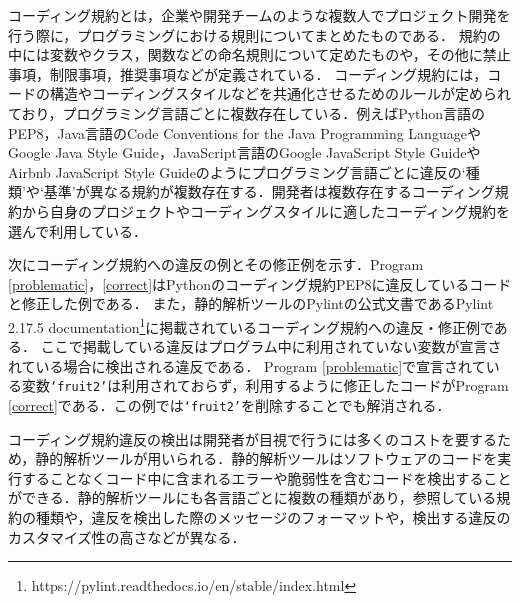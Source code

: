 \documentclass[11pt,dvipdfmx]{jreport}
\begin{document}
コーディング規約とは，企業や開発チームのような複数人でプロジェクト開発を行う際に，プログラミングにおける規則についてまとめたものである．
規約の中には変数やクラス，関数などの命名規則について定めたものや，その他に禁止事項，制限事項，推奨事項などが定義されている．
コーディング規約には，コードの構造やコーディングスタイルなどを共通化させるためのルールが定められており，プログラミング言語ごとに複数存在している．例えばPython言語のPEP8，Java言語のCode Conventions for the Java Programming LanguageやGoogle Java Style Guide，JavaScript言語のGoogle JavaScript Style GuideやAirbnb JavaScript Style Guideのようにプログラミング言語ごとに違反の`種類'や`基準'が異なる規約が複数存在する．開発者は複数存在するコーディング規約から自身のプロジェクトやコーディングスタイルに適したコーディング規約を選んで利用している．

次にコーディング規約への違反の例とその修正例を示す．Program \ref{problematic}，\ref{correct}はPythonのコーディング規約PEP8に違反しているコードと修正した例である．
また，静的解析ツールのPylintの公式文書であるPylint 2.17.5 documentation\footnote{https://pylint.readthedocs.io/en/stable/index.html}に掲載されているコーディング規約への違反・修正例である．
ここで掲載している違反はプログラム中に利用されていない変数が宣言されている場合に検出される違反である．
Program \ref{problematic}で宣言されている変数\texttt{`fruit2'}は利用されておらず，利用するように修正したコードがProgram \ref{correct}である．この例では\texttt{`fruit2'}を削除することでも解消される．

コーディング規約違反の検出は開発者が目視で行うには多くのコストを要するため，静的解析ツールが用いられる．静的解析ツールはソフトウェアのコードを実行することなくコード中に含まれるエラーや脆弱性を含むコードを検出することができる．静的解析ツールにも各言語ごとに複数の種類があり，参照している規約の種類や，違反を検出した際のメッセージのフォーマットや，検出する違反のカスタマイズ性の高さなどが異なる．

\end{document}
